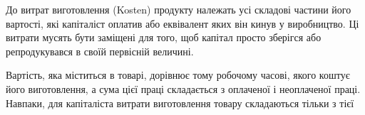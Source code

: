 До витрат виготовлення (Kosten) продукту належать усі
складові частини його вартості, які капіталіст оплатив або еквівалент
яких він кинув у виробництво. Ці витрати мусять бути
заміщені для того, щоб капітал просто зберігся або репродукувався
в своїй первісній величині.

Вартість, яка міститься в товарі, дорівнює тому робочому
часові, якого коштує його виготовлення, а сума цієї праці складається
з оплаченої і неоплаченої праці. Навпаки, для капіталіста
витрати виготовлення товару складаються тільки з тієї
\parbreak{}  %
